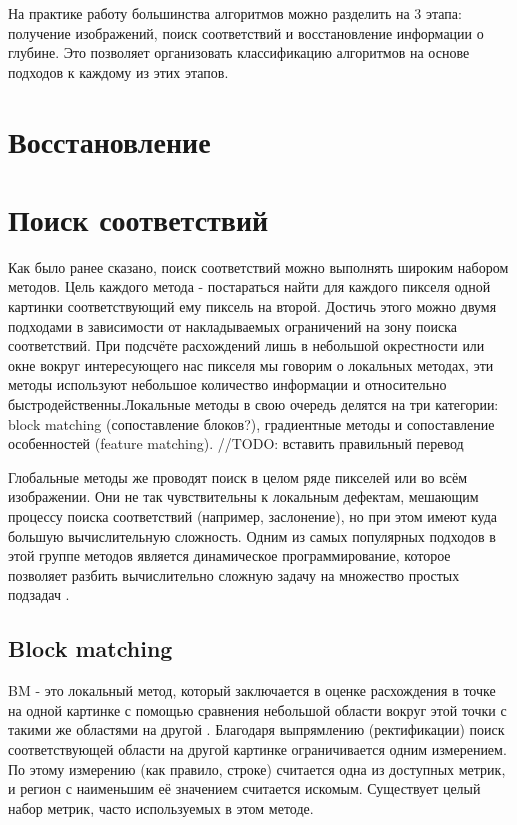 На практике работу большинства алгоритмов можно разделить на 3 этапа: получение изображений, поиск соответствий и восстановление информации о глубине. Это позволяет
организовать классификацию алгоритмов на основе подходов к каждому из этих этапов. 

\section{Восстановление}

\section{Поиск соответствий}

Как было ранее сказано, поиск соответствий можно выполнять широким набором методов. Цель каждого метода - постараться найти для каждого пикселя одной картинки 
соответствующий ему пиксель на второй. Достичь этого можно двумя подходами в зависимости от накладываемых ограничений на зону поиска соответствий.  При подсчёте 
расхождений лишь в небольшой окрестности или окне вокруг интересующего нас пикселя мы говорим о локальных методах, эти методы  используют небольшое количество 
информации и относительно быстродейственны.Локальные методы в свою очередь делятся на три категории: block matching (сопоставление блоков?), градиентные методы и 
сопоставление особенностей (feature matching). 		//TODO: вставить правильный перевод

Глобальные методы же проводят поиск в целом ряде пикселей или во всём изображении. Они не так чувствительны к локальным дефектам, мешающим процессу поиска соответствий 
(например, заслонение), но при этом имеют куда большую вычислительную сложность. Одним из самых популярных подходов в этой группе методов является динамическое программирование, 
которое позволяет разбить вычислительно сложную задачу на множество простых подзадач \cite{dynamic_prog}.   	 

\subsection{Block matching}

BM - это локальный метод, который заключается в оценке расхождения в точке на одной картинке с помощью сравнения небольшой области вокруг этой точки с такими же областями 
на другой \cite{}. Благодаря выпрямлению (ректификации) поиск соответствующей области на другой картинке ограничивается одним измерением. По этому измерению (как правило, строке) 
считается одна из доступных метрик, и регион с наименьшим её значением считается искомым. Существует целый набор метрик, часто используемых в этом методе. 

